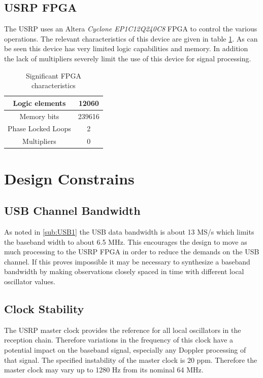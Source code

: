 \documentclass[a4paper]{report}
\numberwithin{equation}{chapter}
\begin{document}
\subsection[USRP FPGA]{USRP FPGA}
\label{sub:FPGA1}
The USRP uses an Altera \textit{Cyclone EP1C12Q240C8} FPGA to control the various operations. The relevant characteristics of this device are given in table \ref{tab:01}. As can be seen this device has very limited logic capabilities and memory. In addition the lack of multipliers severely limit the use of this device for signal processing.

\begin{table}
\begin{center}
\begin{tabular}{|c|c|}
\hline
Logic elements & 12060 \\ \hline
Memory bits & 239616 \\ \hline
Phase Locked Loops & 2 \\ \hline
Multipliers & 0 \\ \hline
\end{tabular}
\caption{Significant FPGA characteristics}
\label{tab:01}
\end{center}
\end{table}

\section[Design Constrains]{Design Constrains}
\subsection[USB Channel Bandwidth]{USB Channel Bandwidth}
\label{sub:USB}

As noted in \ref{sub:USB1} the USB data bandwidth is about 13 MS/s which limits the baseband width to about 6.5 MHz. This encourages the design to move as much processing to the USRP FPGA in order to reduce the demands on the USB channel. If this proves impossible it may be necessary to synthesize a baseband bandwidth by making observations closely spaced in time with different local oscillator values.

\subsection[Clock Stability]{Clock Stability}

The USRP master clock provides the reference for all local oscillators in the reception chain. Therefore variations in the frequency of this clock have a potential impact on the baseband signal, especially any Doppler processing of that signal. The specified instability of the master clock is 20 ppm. Therefore the master clock may vary up to 1280 Hz from its nominal 64 MHz.
\end{document}
